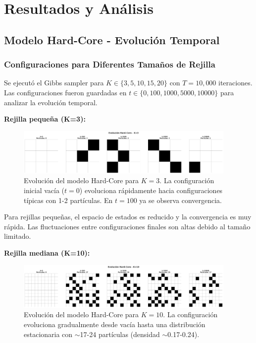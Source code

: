 \section{Resultados y Análisis}

\subsection{Modelo Hard-Core - Evolución Temporal}

\subsubsection{Configuraciones para Diferentes Tamaños de Rejilla}

Se ejecutó el Gibbs sampler para $K \in \{3, 5, 10, 15, 20\}$ con $T=10{,}000$ iteraciones. Las configuraciones fueron guardadas en $t \in \{0, 100, 1000, 5000, 10000\}$ para analizar la evolución temporal.

\textbf{Rejilla pequeña (K=3):}

\begin{figure}[H]
\centering
\includegraphics[width=0.95\textwidth]{../images/hardcore_evolucion_K3.png}
\caption{Evolución del modelo Hard-Core para $K=3$. La configuración inicial vacía ($t=0$) evoluciona rápidamente hacia configuraciones típicas con 1-2 partículas. En $t=100$ ya se observa convergencia.}
\end{figure}

Para rejillas pequeñas, el espacio de estados es reducido y la convergencia es muy rápida. Las fluctuaciones entre configuraciones finales son altas debido al tamaño limitado.

\textbf{Rejilla mediana (K=10):}

\begin{figure}[H]
\centering
\includegraphics[width=0.95\textwidth]{../images/hardcore_evolucion_K10.png}
\caption{Evolución del modelo Hard-Core para $K=10$. La configuración evoluciona gradualmente desde vacía hasta una distribución estacionaria con $\sim$17-24 partículas (densidad $\sim$0.17-0.24).}
\end{figure}

